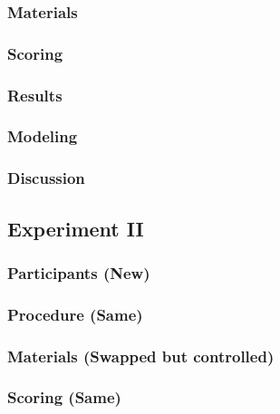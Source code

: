\documentclass[]{book}
\theoremstyle{definition}
\theoremstyle{definition}
\theoremstyle{definition}
\theoremstyle{remark}
\begin{document}
\hypertarget{materials-1}{%
\subsubsection{Materials}\label{materials-1}}

\hypertarget{scoring}{%
\subsubsection{Scoring}\label{scoring}}

\hypertarget{results-1}{%
\subsubsection{Results}\label{results-1}}

\hypertarget{modeling-1}{%
\subsubsection{Modeling}\label{modeling-1}}

\hypertarget{discussion-1}{%
\subsubsection{Discussion}\label{discussion-1}}

\hypertarget{experiment-ii}{%
\subsection{Experiment II}\label{experiment-ii}}

\hypertarget{participants-new}{%
\subsubsection{Participants (New)}\label{participants-new}}

\hypertarget{procedure-same}{%
\subsubsection{Procedure (Same)}\label{procedure-same}}

\hypertarget{materials-swapped-but-controlled}{%
\subsubsection{Materials (Swapped but
controlled)}\label{materials-swapped-but-controlled}}

\hypertarget{scoring-same}{%
\subsubsection{Scoring (Same)}\label{scoring-same}}
\end{document}
